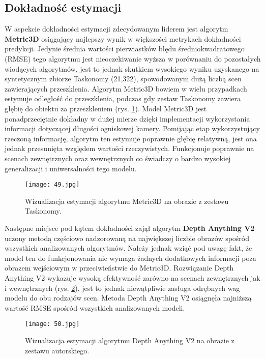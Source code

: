 \subsection{Dokładność estymacji}
W aspekcie dokładności estymacji zdecydowanym liderem jest algorytm \textbf{Metric3D} osiągający najlepszy wynik w większości metrykach dokładności predykcji. Jedynie średnia wartości pierwiastków błędu średniokwadratowego (RMSE) tego algorytmu jest nieoczekiwanie wyższa w porównaniu do pozostałych wiodących algorytmów, jest to jednak skutkiem wysokiego wyniku uzyskanego na syntetycznym zbiorze Taskonomy (21,322), spowodowanym dużą liczbą scen zawierających przeszklenia. Algorytm Metric3D bowiem w wielu przypadkach estymuje odległość do przeszklenia, podczas gdy zestaw Taskonomy zawiera głębię do obiektu za przeszkleniem (rys. \ref{fig:metric3d-taskonomy}). Model Metric3D jest ponadprzeciętnie dokładny w dużej mierze dzięki implementacji wykorzystania informacji dotyczącej długości ogniskowej kamery. Pomijając etap wykorzystujący rzeczoną informację, algorytm ten estymuje poprawnie głębię relatywną, jest ona jednak przesunięta względem wartości rzeczywistych. Funkcjonuje poprawnie na scenach zewnętrznych oraz wewnętrznych co świadczy o bardzo wysokiej generalizacji i uniwersalności tego modelu.
\begin{figure}[H]
    \centering
    \texttt{[image: 49.jpg]}
    \caption{Wizualizacja estymacji algorytmu Metric3D na obrazie z zestawu Taskonomy.}
    \label{fig:metric3d-taskonomy}
\end{figure}

Następne miejsce pod kątem dokładności zajął algorytm \textbf{Depth Anything V2} uczony metodą częściowo nadzorowaną na największej liczbie obrazów spośród wszystkich analizowanych algorytmów. Należy jednak wziąć pod uwagę fakt, że model ten do funkcjonowania nie wymaga żadnych dodatkowych informacji poza obrazem wejściowym w przeciwieństwie do Metric3D. Rozwiązanie Depth Anything V2 wykazuje wysoką efektywność zarówno na scenach zewnętrznych jak i wewnętrznych (rys. \ref{fig:depthanything-stray}), jest to jednak niewątpliwie zasługa odrębnych wag modelu do obu rodzajów scen. Metoda Depth Anything V2 osiągnęła najniższą wartość RMSE spośród wszystkich analizowanych modeli.
\begin{figure}[H]
    \centering
    \texttt{[image: 50.jpg]}
    \caption{Wizualizacja estymacji algorytmu Depth Anything V2 na obrazie z zestawu autorskiego.}
    \label{fig:depthanything-stray}
\end{figure}

